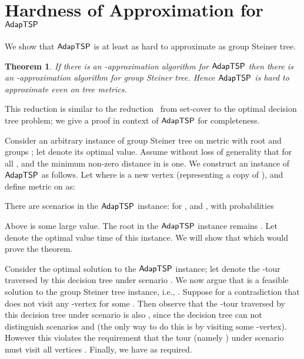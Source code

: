 \documentclass[11pt]{article}
\newtheorem{theorem}[thm]{Theorem}
\def\stsp{\ensuremath{{\sf AdapTSP}}\xspace}
\def\dtp{optimal decision tree problem\xspace}
\newenvironment{pf}{

\noindent{\bf Proof:}} {\hfill


}
\begin{document}
  


\appendix


\section{Hardness of Approximation for \stsp}
\label{app:hardness}

We show that \stsp is at least as hard to approximate as group Steiner tree.
\begin{theorem}\label{th:iso-hard}
If there is an -approximation algorithm for \stsp then there is an  -approximation algorithm for group Steiner tree.
Hence \stsp is  hard to approximate even on tree metrics.
\end{theorem}
\begin{pf}
This reduction is similar to the reduction~\cite{CPRAM11} from set-cover to the \dtp; we give a proof in
context of \stsp for completeness.

  Consider an arbitrary instance of group Steiner tree on metric 
  with root  and groups ; let  denote its
  optimal value. Assume without loss of generality that  for
  all , and the minimum non-zero distance in  is one. We construct an instance of \stsp as follows. Let
   where  is a new vertex (representing a copy of ), and define metric  on
   as:
  

There are  scenarios in the \stsp instance:  for ,
  and , with probabilities
  
Above  is some large value. The root in the \stsp instance remains . Let 
denote the optimal value time of this instance. We will show that  which would
prove the  theorem.

 Consider the optimal solution to the \stsp
instance; let  denote the -tour traversed by this decision tree under scenario . We now argue that
 is a feasible solution to the group Steiner  tree instance, i.e., . Suppose for a
contradiction that  does not visit any -vertex for some . Then observe that the -tour
traversed by this decision tree under scenario  is also , since the  decision tree can not distinguish scenarios
 and  (the only way to do this is by visiting some -vertex). However this violates the requirement
that the tour (namely ) under scenario  must visit all vertices . Finally, we have
 as required. 


\end{pf}
\end{document}
